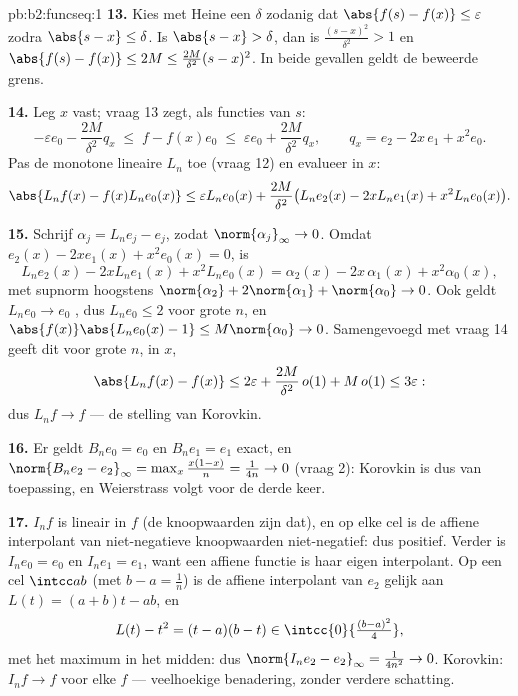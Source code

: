 \begin{solution}{pb:b2:funcseq:1}
\textbf{13.} Kies met Heine een $\delta$ zodanig dat
$\abs{f(s)-f(x)} \leq \varepsilon$ zodra $\abs{s-x} \leq \delta$.
Is $\abs{s - x} > \delta$, dan is $\frac{(s-x)^2}{\delta^2} > 1$ en
$\abs{f(s)-f(x)} \leq 2M \leq \frac{2M}{\delta^2}(s-x)^2$. In beide
gevallen geldt de beweerde grens.

\textbf{14.} Leg $x$ vast; vraag 13 zegt, als functies van $s$:
\[
-\varepsilon e_0 - \frac{2M}{\delta^2}q_x
\;\leq\; f - f(x)e_0
\;\leq\; \varepsilon e_0 + \frac{2M}{\delta^2}q_x,
\qquad q_x = e_2 - 2x\,e_1 + x^2e_0 .
\]
Pas de monotone lineaire $L_n$ toe (vraag 12) en evalueer in $x$:
\[
\abs{L_nf(x) - f(x)L_ne_0(x)}
\leq \varepsilon L_ne_0(x)
+ \frac{2M}{\delta^2}\bigl(L_ne_2(x) - 2xL_ne_1(x)
+ x^2L_ne_0(x)\bigr) .
\]

\textbf{15.} Schrijf $\alpha_j = L_ne_j - e_j$, zodat
$\norm{\alpha_j}_\infty \to 0$. Omdat $e_2(x) - 2xe_1(x) +
x^2e_0(x) = 0$, is
\[
L_ne_2(x) - 2xL_ne_1(x) + x^2L_ne_0(x)
= \alpha_2(x) - 2x\,\alpha_1(x) + x^2\alpha_0(x),
\]
met supnorm hoogstens $\norm{\alpha_2} + 2\norm{\alpha_1} +
\norm{\alpha_0} \to 0$. Ook geldt $L_ne_0 \to e_0$ , dus
$L_ne_0 \leq 2$ voor grote $n$, en $\abs{f(x)}\abs{L_ne_0(x) - 1}
\leq M\norm{\alpha_0} \to 0$. Samengevoegd met vraag 14 geeft dit
voor grote $n$,  in $x$,
\[
\abs{L_nf(x) - f(x)} \leq 2\varepsilon +
\frac{2M}{\delta^2}\,o(1) + M\,o(1) \leq 3\varepsilon :
\]
dus $L_nf \to f$  --- de stelling van Korovkin.

\textbf{16.} Er geldt $B_ne_0 = e_0$ en $B_ne_1 = e_1$ exact, en
$\norm{B_ne_2 - e_2}_\infty = \max_x\frac{x(1-x)}{n} = \frac{1}{4n}
\to 0$ (vraag 2): Korovkin is dus van toepassing, en Weierstrass
volgt voor de derde keer.

\textbf{17.} $I_nf$ is lineair in $f$ (de knoopwaarden zijn dat),
en op elke cel is de affiene interpolant van niet-negatieve
knoopwaarden niet-negatief: dus positief. Verder is $I_ne_0 = e_0$
en $I_ne_1 = e_1$, want een affiene functie is haar eigen
interpolant. Op een cel $\intcc ab$ (met $b - a = \frac1n$) is de
affiene interpolant van $e_2$ gelijk aan $L(t) = (a+b)t - ab$, en
\[
L(t) - t^2 = (t-a)(b-t) \in
\intcc{0}{\tfrac{(b-a)^2}{4}} ,
\]
met het maximum in het midden: dus $\norm{I_ne_2 - e_2}_\infty =
\frac{1}{4n^2} \to 0$. Korovkin: $I_nf \to f$  voor elke
 $f$ --- veelhoekige benadering, zonder verdere schatting.


\end{solution}
